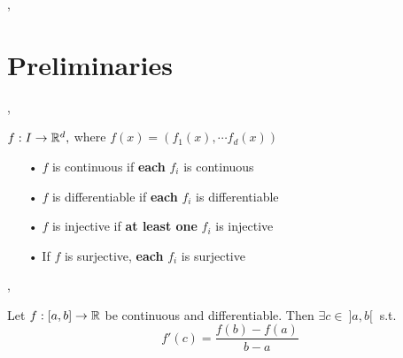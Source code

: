 \sep
\section{Preliminaries}
\sep

\Def $f: I \rightarrow \mathbb{R}^d,$ where $f(x) = (f_1(x), \cdots f_d(x))$
\begin{enumerate}
\item[•] $f$ is continuous if \textbf{each} $f_i$ is continuous
\item[•] $f$ is differentiable if \textbf{each} $f_i$ is differentiable
\item[•] $f$ is injective if \textbf{at least one} $f_i$ is injective
\item[•] If $f$ is surjective, \textbf{each} $f_i$ is surjective
\end{enumerate}

\sep

 Let $f:[a,b] \rightarrow \mathbb{R}$ be continuous and differentiable. Then $\exists c \in \ ]a, b[ \ $ s.t.
\[f'(c) = \frac{f(b) - f(a)}{b - a} \]